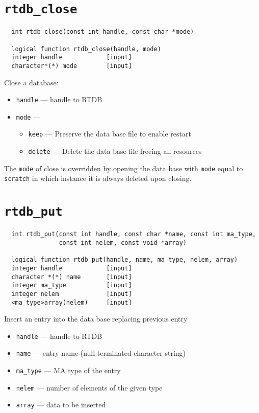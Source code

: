 \section{{\tt rtdb\_close}}
\begin{verbatim}
  int rtdb_close(const int handle, const char *mode)

  logical function rtdb_close(handle, mode)
  integer handle            [input]
  character*(*) mode        [input]
\end{verbatim}
Close a database:
\begin{itemize}
\item {\tt handle} --- handle to RTDB
\item {\tt mode} ---
\begin{itemize}
\item {\tt keep} ---    Preserve the data base file to enable restart
\item {\tt delete} ---  Delete the data base file freeing all resources
\end{itemize}
\end{itemize}
The {\tt mode} of close is overridden by opening the data base with
{\tt mode} equal to {\tt scratch} in which instance it is always
deleted upon closing.

\section{{\tt rtdb\_put}}
\begin{verbatim}
  int rtdb_put(const int handle, const char *name, const int ma_type,
               const int nelem, const void *array)

  logical function rtdb_put(handle, name, ma_type, nelem, array)
  integer handle            [input]
  character *(*) name       [input]
  integer ma_type           [input]
  integer nelem             [input]
  <ma_type>array(nelem)     [input]
\end{verbatim}
Insert an entry into the data base replacing previous entry
\begin{itemize}
\item {\tt handle} --- handle to RTDB
\item {\tt name} --- entry name (null terminated character string)
\item {\tt ma\_type} --- MA type of the entry
\item {\tt nelem} --- number of elements of the given type
\item {\tt array} --- data to be inserted
\end{itemize}

